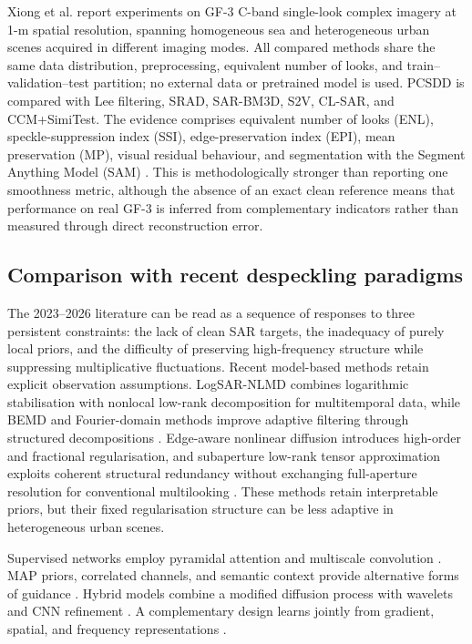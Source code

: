 \documentclass[11pt]{article}
\begin{document}
Xiong et al. report experiments on GF-3 C-band single-look complex imagery at 1-m spatial resolution, spanning homogeneous sea and heterogeneous urban scenes acquired in different imaging modes. All compared methods share the same data distribution, preprocessing, equivalent number of looks, and train--validation--test partition; no external data or pretrained model is used. PCSDD is compared with Lee filtering, SRAD, SAR-BM3D, S2V, CL-SAR, and CCM+SimiTest. The evidence comprises equivalent number of looks (ENL), speckle-suppression index (SSI), edge-preservation index (EPI), mean preservation (MP), visual residual behaviour, and segmentation with the Segment Anything Model (SAM) \cite{Xiong2026PCSDD}. This is methodologically stronger than reporting one smoothness metric, although the absence of an exact clean reference means that performance on real GF-3 is inferred from complementary indicators rather than measured through direct reconstruction error.

\subsection{Comparison with recent despeckling paradigms}

The 2023--2026 literature can be read as a sequence of responses to three persistent constraints: the lack of clean SAR targets, the inadequacy of purely local priors, and the difficulty of preserving high-frequency structure while suppressing multiplicative fluctuations. Recent model-based methods retain explicit observation assumptions. LogSAR-NLMD combines logarithmic stabilisation with nonlocal low-rank decomposition for multitemporal data, while BEMD and Fourier-domain methods improve adaptive filtering through structured decompositions \cite{Kang2023LogSAR,Painam2023BEMD,Jain2023DFT}. Edge-aware nonlinear diffusion introduces high-order and fractional regularisation, and subaperture low-rank tensor approximation exploits coherent structural redundancy without exchanging full-aperture resolution for conventional multilooking \cite{Bua2024EdgeAware,An2025Subaperture}. These methods retain interpretable priors, but their fixed regularisation structure can be less adaptive in heterogeneous urban scenes.

Supervised networks employ pyramidal attention and multiscale convolution \cite{Yasmeen2023PAN,Wen2023SAMSCNN}. MAP priors, correlated channels, and semantic context provide alternative forms of guidance \cite{Zhu2023PBDNN,Saha2025CDCFRN,Bo2026SemDNet}. Hybrid models combine a modified diffusion process with wavelets and CNN refinement \cite{Baraha2025Hybrid}. A complementary design learns jointly from gradient, spatial, and frequency representations \cite{Saha2026MultiChannel}.
\end{document}
